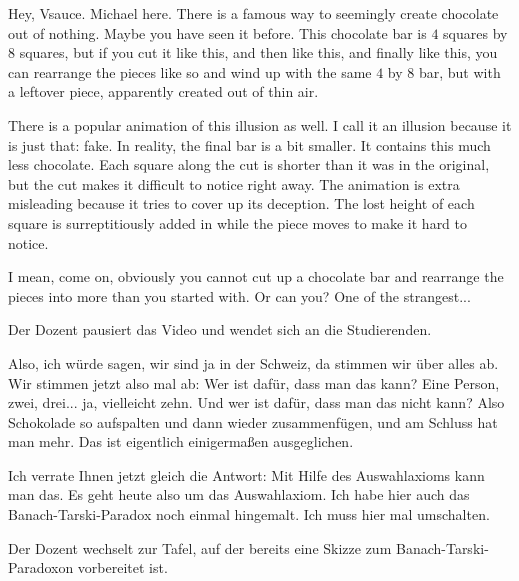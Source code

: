 \begin{spoken-clean}[00:00:28 - 00:01:46]
Hey, Vsauce. Michael here. There is a famous way to seemingly create chocolate out of nothing. Maybe you have seen it before. This chocolate bar is $4$ squares by $8$ squares, but if you cut it like this, and then like this, and finally like this, you can rearrange the pieces like so and wind up with the same $4$ by $8$ bar, but with a leftover piece, apparently created out of thin air.

There is a popular animation of this illusion as well. I call it an illusion because it is just that: fake. In reality, the final bar is a bit smaller. It contains this much less chocolate. Each square along the cut is shorter than it was in the original, but the cut makes it difficult to notice right away. The animation is extra misleading because it tries to cover up its deception. The lost height of each square is surreptitiously added in while the piece moves to make it hard to notice.

I mean, come on, obviously you cannot cut up a chocolate bar and rearrange the pieces into more than you started with. Or can you? One of the strangest...
\end{spoken-clean}

\begin{meta-note}
Der Dozent pausiert das Video und wendet sich an die Studierenden.
\end{meta-note}

\begin{spoken-clean}[00:01:46 - 00:02:32]
Also, ich würde sagen, wir sind ja in der Schweiz, da stimmen wir über alles ab. Wir stimmen jetzt also mal ab: Wer ist dafür, dass man das kann? Eine Person, zwei, drei... ja, vielleicht zehn. Und wer ist dafür, dass man das nicht kann? Also Schokolade so aufspalten und dann wieder zusammenfügen, und am Schluss hat man mehr. Das ist eigentlich einigermaßen ausgeglichen.

Ich verrate Ihnen jetzt gleich die Antwort: Mit Hilfe des Auswahlaxioms kann man das. Es geht heute also um das Auswahlaxiom. Ich habe hier auch das Banach-Tarski-Paradox noch einmal hingemalt. Ich muss hier mal umschalten.
\end{spoken-clean}

\begin{meta-note}[Tafelübergang]
Der Dozent wechselt zur Tafel, auf der bereits eine Skizze zum Banach-Tarski-Paradoxon vorbereitet ist.
\end{meta-note}

